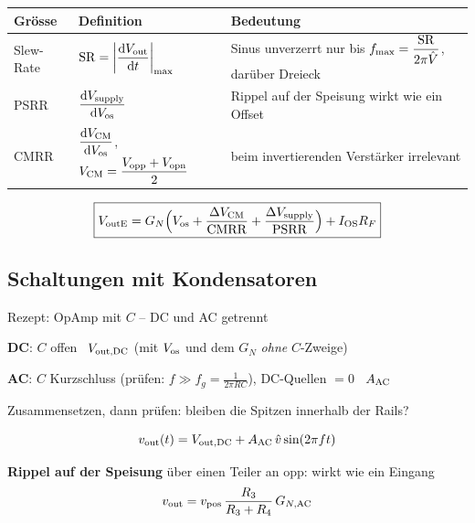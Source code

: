\vspace{4pt}
{\renewcommand{\arraystretch}{1.7}
\begin{tabularx}{\columnwidth}{@{}l l X@{}}
	\toprule
	\textbf{Grösse} & \textbf{Definition} & \textbf{Bedeutung} \\ \midrule
	Slew-Rate & ${\rm SR} = \left|\dfrac{\mathop{} \! \mathrm{d} V_{\rm out}}{\mathop{} \! \mathrm{d} t}\right|_{\max}$
	          & Sinus unverzerrt nur bis $f_{\max} = \dfrac{\rm SR}{2\pi \hat V}$, darüber Dreieck \\
	PSRR      & $\dfrac{\mathop{} \! \mathrm{d} V_{\rm supply}}{\mathop{} \! \mathrm{d} V_{\rm os}}$
	          & Rippel auf der Speisung wirkt wie ein Offset \\
	CMRR      & $\dfrac{\mathop{} \! \mathrm{d} V_{\rm CM}}{\mathop{} \! \mathrm{d} V_{\rm os}}$, \; $V_{\rm CM} = \dfrac{V_{\rm opp}+V_{\rm opn}}{2}$
	          & beim invertierenden Verstärker irrelevant \\ \bottomrule
\end{tabularx}}
$$ \boxed{ V_{\rm outE} = G_N\Big(V_{\rm os} + \frac{\Delta V_{\rm CM}}{\rm CMRR} + \frac{\Delta V_{\rm supply}}{\rm PSRR}\Big) + I_{\rm OS} R_F } $$

\subsection{Schaltungen mit Kondensatoren}\label{sec:opamp-C}

\begin{rezept}{Rezept: OpAmp mit $C$ -- DC und AC getrennt}
	\begin{steps}
		\item \textbf{DC}: $C$ offen \textrightarrow\ $V_{\rm out,DC}$ (mit $V_{\rm os}$ und dem $G_N$ \emph{ohne} $C$-Zweige)
		\item \textbf{AC}: $C$ Kurzschluss (prüfen: $f \gg f_g = \frac{1}{2\pi RC}$), DC-Quellen $=0$ \textrightarrow\ $A_{\rm AC}$
		\item Zusammensetzen, dann prüfen: bleiben die Spitzen innerhalb der Rails?
	\end{steps}
	$$ v_{\rm out}(t) = V_{\rm out,DC} + A_{\rm AC}\,\hat v \sin(2\pi f t) $$
\end{rezept}
\textbf{Rippel auf der Speisung} über einen Teiler an opp: wirkt wie ein Eingang
$$ v_{\rm out} = v_{\rm pos}\,\frac{R_3}{R_3+R_4}\,G_{N,\rm AC} $$

